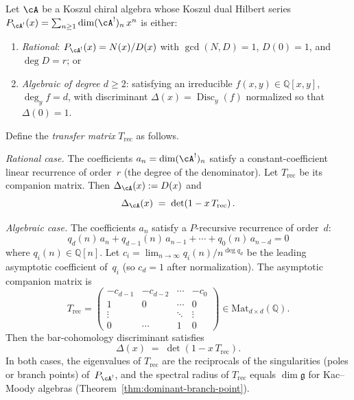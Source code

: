 \begin{theorem}\label{thm:discriminant-spectral}
Let $\cA$ be a Koszul chiral algebra whose Koszul dual Hilbert
series $P_{\cA^!}(x) = \sum_{n \geq 1} \dim(\cA^!)_n\, x^n$
is either:
\begin{enumerate}[label=\textup{(\alph*)}]
\item \emph{Rational}: $P_{\cA^!}(x) = N(x)/D(x)$ with
$\gcd(N,D) = 1$, $D(0) = 1$, and $\deg D = r$; or
\item \emph{Algebraic of degree $d \geq 2$}: satisfying an
irreducible $f(x,y) \in \mathbb{Q}[x,y]$, $\deg_y f = d$,
with discriminant $\Delta(x) = \operatorname{Disc}_y(f)$
normalized so that $\Delta(0) = 1$.
\end{enumerate}
Define the \emph{transfer matrix} $T_{\mathrm{rec}}$ as follows.

\emph{Rational case.}
The coefficients $a_n = \dim(\cA^!)_n$ satisfy a
constant-coefficient linear recurrence of order~$r$
(the degree of the denominator). Let $T_{\mathrm{rec}}$
be its companion matrix. Then $\Delta_{\cA}(x) := D(x)$ and
\begin{equation}\label{eq:discriminant-spectral-rational}
\Delta_{\cA}(x) \;=\; \det\!\left(1 - x\, T_{\mathrm{rec}}\right).
\end{equation}

\emph{Algebraic case.}
The coefficients $a_n$ satisfy a $P$-recursive recurrence
of order~$d$:
\begin{equation}\label{eq:p-recursive-recurrence}
q_d(n)\, a_n + q_{d-1}(n)\, a_{n-1} + \cdots + q_0(n)\, a_{n-d} = 0
\end{equation}
where $q_i(n) \in \mathbb{Q}[n]$. Let $c_i = \lim_{n \to \infty}
q_i(n)/n^{\deg q_d}$ be the leading asymptotic coefficient of~$q_i$
\textup{(}so $c_d = 1$ after normalization\textup{)}.
The asymptotic companion matrix is
\[
T_{\mathrm{rec}} =
\begin{pmatrix}
-c_{d-1} & -c_{d-2} & \cdots & -c_0 \\
1 & 0 & \cdots & 0 \\
\vdots & & \ddots & \vdots \\
0 & \cdots & 1 & 0
\end{pmatrix}
\in \mathrm{Mat}_{d \times d}(\mathbb{Q}).
\]
Then the bar-cohomology discriminant satisfies
\begin{equation}\label{eq:discriminant-spectral-general}
\Delta(x) \;=\; \det\!\left(1 - x\, T_{\mathrm{rec}}\right).
\end{equation}
In both cases, the eigenvalues of $T_{\mathrm{rec}}$ are the
reciprocals of the singularities \textup{(}poles or branch
points\textup{)} of~$P_{\cA^!}$, and the spectral
radius of $T_{\mathrm{rec}}$ equals $\dim\mathfrak{g}$ for
Kac--Moody algebras
\textup{(}Theorem~\textup{\ref{thm:dominant-branch-point})}.
\end{theorem}

